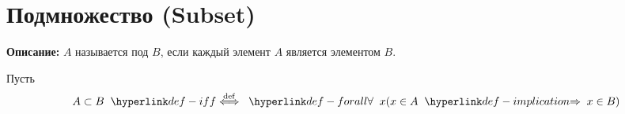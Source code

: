 
\section{Подмножество (Subset)}
\label{entity:obj-subset}

\textbf{Описание:}
 $A$ называется под  $B$, если каждый элемент $A$ является элементом $B$.

\hypertarget{def-subset}{}
\begin{definition}
Пусть
\[
A \subset B \TermDefIff \TerForall x (x \in A \TermImplication x \in B)
\]
\end{definition}